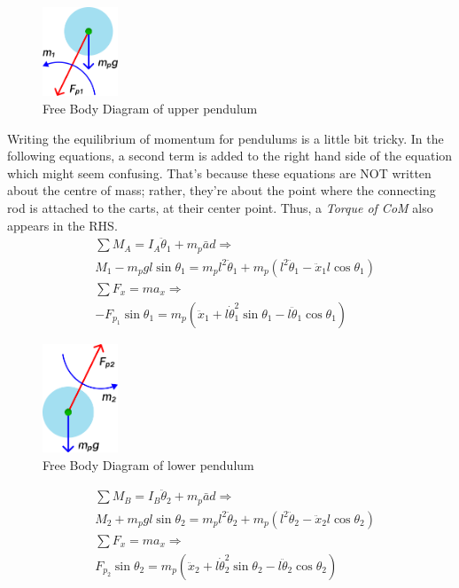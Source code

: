\documentclass[conference]{IEEEtran}
\begin{document}
\begin{figure}[htbp]
    \centerline{\includegraphics[width=0.2\textwidth]{figures/pendulum1.png}}
    \caption{Free Body Diagram of upper pendulum}
    \label{fig:pen1}
\end{figure}

Writing the equilibrium of momentum for pendulums is a little bit tricky. In the following equations, a second term is added to the right hand side of the equation which might seem confusing. That's because these equations are NOT written about the centre of mass; rather, they're about the point where the connecting rod is attached to the carts, at their center point. Thus, a \textit{Torque of CoM} also appears in the RHS.
\begin{align}
     & \sum M_A=I_A \ddot{\theta}_1+m_p \bar{a} d \Longrightarrow \nonumber                                               \\
     & M_1-m_p g l \sin \theta_1=m_p l^2 \ddot{\theta}_1+m_p\left(l^2 \ddot{\theta}_1-\ddot{x}_1 l \cos \theta_1\right)   \\
     & \sum F_x = m a_x \Longrightarrow \nonumber                                                                         \\
     & -F_{p_1} \sin \theta_1=m_p\left(\ddot{x}_1+l \dot{\theta}_1^2 \sin \theta_1-l \ddot{\theta}_1 \cos \theta_1\right)
\end{align}

\begin{figure}[htbp]
    \centerline{\includegraphics[width=0.2\textwidth]{figures/pendulum2.png}}
    \caption{Free Body Diagram of lower pendulum}
    \label{fig:pen2}
\end{figure}

\begin{align}
     & \sum M_B=I_B \ddot{\theta}_2+m_p \bar{a} d \Longrightarrow \nonumber                                                                 \\
     & M_2+m_p g l \sin \theta_2=m_p l^2 \ddot{\theta}_2+m_p\left(l^2 \ddot{\theta}_2-\ddot{x}_2 l \cos \theta_2\right)                     \\
     & \sum F_x = m a_x \Longrightarrow \nonumber                                                                                           \\
     & F_{p_2} \sin \theta_2=m_p\left(\ddot{x}_2+l \dot{\theta}_2^2 \sin \theta_2-l \ddot{\theta}_2 \cos \theta_2\right) \label{eq:newton6}
\end{align}
\end{document}
